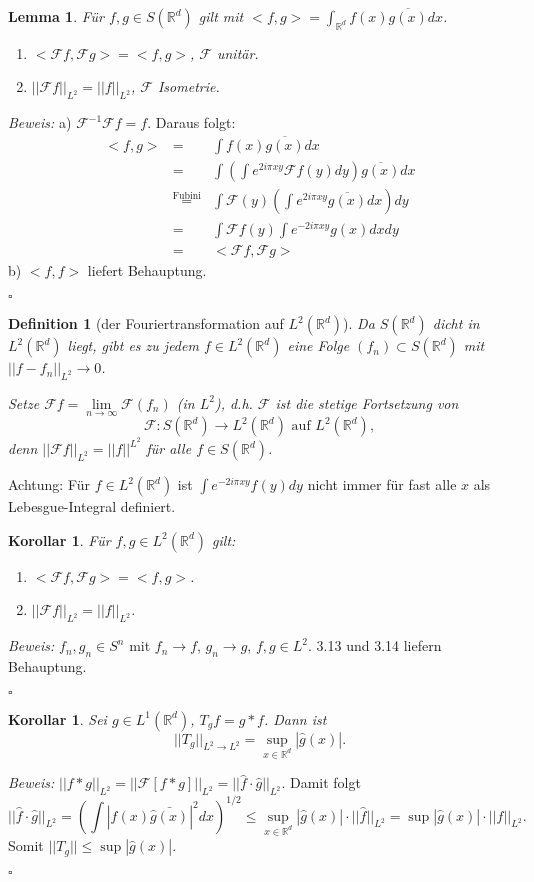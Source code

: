 \documentclass[12pt,a4paper,titlepage]{scrartcl}
\newtheorem{Definition}[Satz]{Definition}
\newtheorem{Lemma}[Satz]{Lemma}
\newtheorem{Korollar}[Satz]{Korollar}
\numberwithin{equation}{section}
\newcommand{\R}{\mathbb{R}} %
\newcommand{\f}{\hat{f}}
\newcommand{\g}{\hat{g}}
\newcommand{\F}{\mathcal{F}}
\newcommand{\m}{\cdot}
\newcommand{\Bew}{\emph{Beweis: }}
\newcommand{\qed}{\begin{flushright}
		$\square$
	\end{flushright}}
\begin{document}
	\begin{Lemma}
		Für $f, g\in S(\R^d)$ gilt mit $<f,g> = \int_{\R^{d}} f(x) \overline{g(x)}dx$.
		\begin{enumerate}
			\item[a)] $<\F f,\F g> = <f,g>$, $\F$ unitär.
			\item[b)] $||\F f||_{L^2} = ||f||_{L^2}$, $\F$ Isometrie.
		\end{enumerate}
	\end{Lemma}
	\Bew a) $\F^{-1}\F f = f$. Daraus folgt:
	\begin{eqnarray}
		<f,g> &=&\int f(x)\overline{g(x)}dx\nonumber\\
		&=& \int\left(\int e^{2i\pi x y}\F f(y)dy \right)\overline{g(x)}dx \nonumber \\
		&\overset{\text{Fubini}}{=}& \int \F(y)\left(\int e^{2i\pi xy} \overline{g(x)}dx\right)dy\nonumber\\
		&=& \int \F f(y) \int e^{-2i\pi xy}g(x)dx dy\nonumber\\
		&=& <\F f, \F g>\nonumber
	\end{eqnarray}
	b) $<f,f>$ liefert Behauptung.
	\qed
	
	\begin{Definition}[der Fouriertransformation auf $L^2(\R^d)$]
		Da $S(\R^d)$ dicht in $L^{2}(\R^d)$ liegt, gibt es zu jedem $f\in L^{2}(\R^d)$ eine Folge $(f_n)\subset S(\R^d)$ mit $||f-f_n||_{L^2}\rightarrow 0$.
		
		Setze $\F f =\lim\limits_{n\rightarrow\infty}\F(f_n)$ (in $L^2$), d.h. $\F$ ist die stetige Fortsetzung von 
		$$\F:S(\R^d)\rightarrow L^2(\R^d) \text{ auf } L^2(\R^d),$$	
		denn $||\F f||_{L^2} = ||f||^{L^2}$ für alle $f\in S(\R^d)$.
	\end{Definition}
	Achtung: Für $f\in L^2(\R^d)$ ist $\int e^{-2i\pi xy}f(y)dy$ nicht immer für fast alle $x$ als Lebesgue-Integral definiert.
	
	\begin{Korollar}
		Für $f, g\in L^2(\R^d)$ gilt:
		\begin{enumerate}
			\item[a)] $<\F f,\F g> = <f,g>$.
			\item[b)] $||\F f||_{L^2} = ||f||_{L^2}$.
		\end{enumerate}
	\end{Korollar}
	\Bew $f_n,g_n\in S^n$ mit $f_n\rightarrow f$, $g_n\rightarrow g$, $f,g\in L^2$. 3.13 und 3.14 liefern Behauptung.
	\qed
	
	\begin{Korollar}
		Sei $g\in L^{1}(\R^d)$, $T_g f= g*f$. Dann ist 
		$$||T_g||_{L^2\rightarrow L^2} = \sup_{x\in \R^d}|\g(x)|.$$
	\end{Korollar}
	\Bew $||f*g||_{L^2} = ||\F[f*g]||_{L^2} = ||\f\m\g||_{L^2}$.  Damit folgt
	$$||\f\m\g||_{L^2} = \left(\int |f(x)\bar{\g(x)}|^2 dx \right)^{1/2}\leq \sup_{x\in \R^d}|\g(x)|\m||\f||_{L^2} = \sup|\g(x)|\m ||f||_{L^2}.$$
	Somit $||T_g||\leq \sup|\g(x)|$.
	\qed 
	
\end{document}
